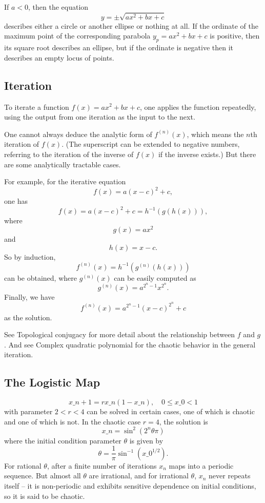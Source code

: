 If $a < 0$, then the equation
\[
y = \pm \sqrt{ax^2 + bx + c}
\]
describes either a circle or another ellipse or nothing at all. If the ordinate of the maximum point of the corresponding parabola $y_p = ax^2 + bx + c$ is positive, then its square root describes an ellipse, but if the ordinate is negative then it describes an empty locus of points.

\subsection{Iteration}
\label{sss:iter-6f01}

To iterate a function $f(x) = ax^2 + bx + c$, one applies the function repeatedly, using the output from one iteration as the input to the next.

One cannot always deduce the analytic form of $f^{(n)}(x)$, which means the $n$th iteration of $f(x)$. (The superscript can be extended to negative numbers, referring to the iteration of the inverse of $f(x)$ if the inverse exists.) But there are some analytically tractable cases.

For example, for the iterative equation
\[
f(x) = a(x - c)^2 + c,
\]
one has
\[
f(x) = a(x - c)^2 + c = h^{-1}(g(h(x))),
\]
where
\[
g(x) = ax^2
\]
and
\[
h(x) = x - c.
\]
So by induction,
\[
f^{(n)}(x) = h^{-1}(g^{(n)}(h(x)))
\]
can be obtained, where $g^{(n)}(x)$ can be easily computed as
\[
g^{(n)}(x) = a^{2^n - 1} x^{2^n}.
\]
Finally, we have
\[
f^{(n)}(x) = a^{2^n - 1}(x - c)^{2^n} + c
\]
as the solution.

See Topological conjugacy for more detail about the relationship between $f$ and $g$. And see Complex quadratic polynomial for the chaotic behavior in the general iteration.

\subsection{The Logistic Map}
\label{sss:thel-fba9}

\[
x\_{n+1} = rx\_n (1 - x\_n), \quad 0 \leq x\_0 < 1
\]
with parameter $2 < r < 4$ can be solved in certain cases, one of which is chaotic and one of which is not. In the chaotic case $r = 4$, the solution is
\[
x\_n = \sin^2(2^n \theta \pi)
\]
where the initial condition parameter $\theta$ is given by
\[
\theta = \frac{1}{\pi} \sin^{-1}(x\_0^{1/2}).
\]
For rational $\theta$, after a finite number of iterations $x_n$ maps into a periodic sequence. But almost all $\theta$ are irrational, and for irrational $\theta$, $x_n$ never repeats itself – it is non-periodic and exhibits sensitive dependence on initial conditions, so it is said to be chaotic.

